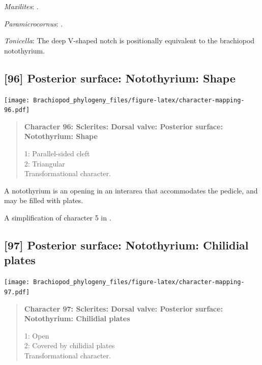 \documentclass[openany]{book}
\begin{document}
\hypertarget{Maxilites-coding-95}{}
\emph{Maxilites}: \citet{Marek1972}.

\hypertarget{Paramicrocornus-coding-95}{}
\emph{Paramicrocornus}: \citet{Zhang2018Ahyolithid}.

\hypertarget{Tonicella-coding-95}{}
\emph{Tonicella}: The deep V-shaped notch \citep[fig. 8]{Schwabe2010} is
positionally equivalent to the brachiopod notothyrium.

\subsection*{{[}96{]} Posterior surface: Notothyrium:
Shape}\label{posterior-surface-notothyrium-shape}

\texttt{[image: Brachiopod\_phylogeny\_files/figure-latex/character-mapping-96.pdf]}

\begin{quote}
\textbf{Character 96: Sclerites: Dorsal valve: Posterior surface:
Notothyrium: Shape}

1: Parallel-sided cleft\\
2: Triangular\\
Transformational character.
\end{quote}

A notothyrium is an opening in an interarea that accommodates the
pedicle, and may be filled with plates.

A simplification of character 5 in
\citet{Bassett2001Functionalmorphology}.

\subsection*{{[}97{]} Posterior surface: Notothyrium: Chilidial
plates}\label{posterior-surface-notothyrium-chilidial-plates}

\texttt{[image: Brachiopod\_phylogeny\_files/figure-latex/character-mapping-97.pdf]}

\begin{quote}
\textbf{Character 97: Sclerites: Dorsal valve: Posterior surface:
Notothyrium: Chilidial plates}

1: Open\\
2: Covered by chilidial plates\\
Transformational character.
\end{quote}
\end{document}
